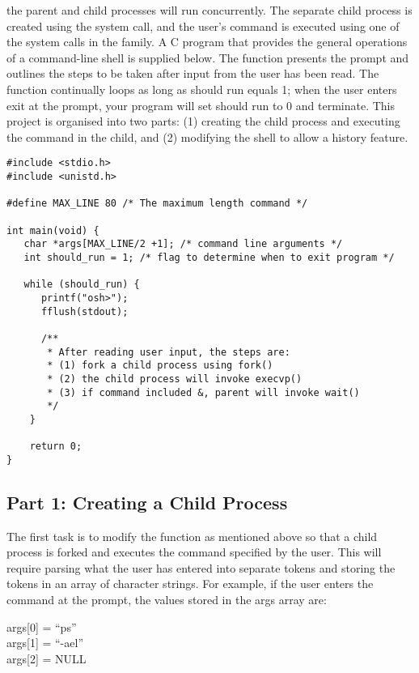 \begin{flushleft}
\end{flushleft}

the parent and child processes will run concurrently.
The separate child process is created using the  system call, and the user's command is executed using one of the system calls in the  family.
A C program that provides the general operations of a command-line shell is supplied below. The  function presents the prompt  and outlines the steps to be taken after input from the user has been read. The  function continually loops as long as should run equals 1; when the user enters exit at the prompt, your program will set should run to 0 and terminate.
This project is organised into two parts: (1) creating the child process and executing the command in the child, and (2) modifying the shell to allow a history feature.
\begin{lstlisting}
#include <stdio.h>
#include <unistd.h>

#define MAX_LINE 80 /* The maximum length command */

int main(void) {
   char *args[MAX_LINE/2 +1]; /* command line arguments */
   int should_run = 1; /* flag to determine when to exit program */
   
   while (should_run) {
      printf("osh>");
      fflush(stdout);
      
      /**
       * After reading user input, the steps are:
       * (1) fork a child process using fork()
       * (2) the child process will invoke execvp()
       * (3) if command included &, parent will invoke wait()
       */
    }
    
    return 0;
}
\end{lstlisting}

\subsection*{Part 1: Creating a Child Process}
The first task is to modify the  function as mentioned above so that a child process is forked and executes the command specified by the user. This will require parsing what the user has entered into separate tokens and storing the tokens in an array of character strings. For example, if the user enters the command  at the  prompt, the values stored in the args array are:
\begin{flushleft}
args[0] = ``ps''\\
args[1] = ``-ael''\\
args[2] = NULL
\end{flushleft}

